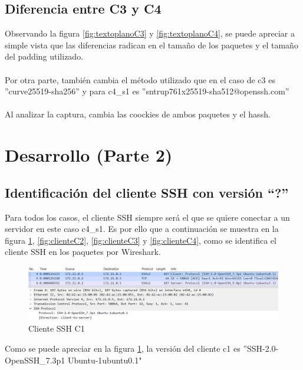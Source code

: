 \documentclass[letter,12pt]{article}
\begin{document}
\subsection{Diferencia entre C3 y C4}

Observando la figura \ref{fig:textoplanoC3} y \ref{fig:textoplanoC4}, se puede apreciar a simple vista que las diferencias radican en el tamaño de los paquetes y el tamaño del padding utilizado.\\
\\
Por otra parte, también cambia el método utilizado que en el caso de c3 es ''curve25519-sha256'' y para c4\_s1 es ''sntrup761x25519-sha512@openssh.com''\\
\\
Al analizar la captura, cambia las coockies de ambos paquetes y el hassh.


\newpage

\section{Desarrollo (Parte 2)}

\subsection{Identificación del cliente SSH con versión \textquotedblleft?\textquotedblright}

Para todos los casos, el cliente SSH siempre será el que se quiere conectar a un servidor en este caso c4\_s1. Es por ello que a continuación se muestra en la figura \ref{fig:clienteC1}, \ref{fig:clienteC2}, \ref{fig:clienteC3} y \ref{fig:clienteC4}, como se identifica el cliente SSH en los paquetes por Wireshark.

\begin{figure}[ht]
    \centering
    \includegraphics[width=1\linewidth]{Images/parte2/clienteSSH/clienteC1.png}
    \caption{Cliente SSH C1}
    \label{fig:clienteC1}
\end{figure}

Como se puede apreciar en la figura \ref{fig:clienteC1}, la versión del cliente c1 es ''SSH-2.0-OpenSSH\_7.3p1 Ubuntu-1ubuntu0.1"
\end{document}
